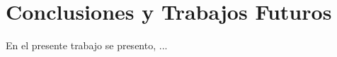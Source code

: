 \def\baselinestretch{1}
\chapter{Conclusiones y Trabajos Futuros}
\label{cha:conclusiones}
\ifpdf
\graphicspath{{Conclusions/ConclusionsFigs/PNG/}{Conclusions/ConclusionsFigs/PDF/}{Conclusions/ConclusionsFigs/}}
\else
\graphicspath{{Conclusions/ConclusionsFigs/EPS/}{Conclusions/ConclusionsFigs/}}
\fi
\def\baselinestretch{1.66}


En el presente trabajo se presento, ...
